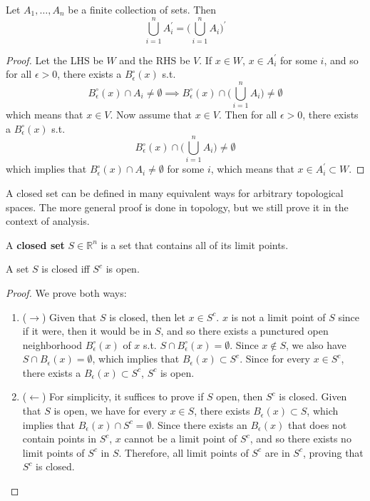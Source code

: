 \documentclass{article}
\begin{document}
    \begin{theorem}
      Let $A_1, \ldots, A_n$ be a finite collection of sets. Then 
      \[\bigcup_{i=1}^n A_i^\prime = \bigg( \bigcup_{i=1}^n A_i \bigg)^\prime\]
    \end{theorem}
    \begin{proof}
      Let the LHS be $W$ and the RHS be $V$. If $x \in W$, $x \in A_i^\prime$ for some $i$, and so for all $\epsilon > 0$, there exists a $B_\epsilon^\circ (x)$ s.t. 
      \[B_\epsilon^\circ (x) \cap A_i \neq \emptyset \implies B_\epsilon^\circ (x) \cap \bigg( \bigcup_{i=1}^n A_i \bigg) \neq \emptyset\]
      which means that $x \in V$. Now assume that $x \in V$. Then for all $\epsilon > 0$, there exists a $B_\epsilon^\circ (x)$ s.t. 
      \[B_\epsilon^\circ (x) \cap \bigg( \bigcup_{i=1}^n A_i \bigg) \neq \emptyset\]
      which implies that $B_\epsilon^\circ (x) \cap A_i \neq \emptyset$ for some $i$, which means that $x \in A_i^\prime \subset W$. 
    \end{proof}

    A closed set can be defined in many equivalent ways for arbitrary topological spaces. The more general proof is done in topology, but we still prove it in the context of analysis. 

    \begin{definition}
      A \textbf{closed set} $S \in \mathbb{R}^n$ is a set that contains all of its limit points. 
    \end{definition}

    \begin{theorem}
      A set $S$ is closed iff $S^c$ is open. 
    \end{theorem}
    \begin{proof}
      We prove both ways: 
      \begin{enumerate}
        \item ($\rightarrow$) Given that $S$ is closed, then let $x \in S^c$. $x$ is not a limit point of $S$ since if it were, then it would be in $S$, and so there exists a punctured open neighborhood $B_\epsilon^\circ (x)$ of $x$ s.t. $S \cap B_\epsilon^\circ (x) = \emptyset$. Since $x \not\in S$, we also have $S \cap B_\epsilon (x) = \emptyset$, which implies that $B_\epsilon (x) \subset S^c$. Since for every $x \in S^c$, there exists a $B_\epsilon (x) \subset S^c$, $S^c$ is open. 

        \item ($\leftarrow$) For simplicity, it suffices to prove if $S$ open, then $S^c$ is closed. Given that $S$ is open, we have for every $x \in S$, there exists $B_\epsilon (x) \subset S$, which implies that $B_\epsilon (x) \cap S^c = \emptyset$. Since there exists an $B_\epsilon (x)$ that does not contain points in $S^c$, $x$ cannot be a limit point of $S^c$, and so there exists no limit points of $S^c$ in $S$. Therefore, all limit points of $S^c$ are in $S^c$, proving that $S^c$ is closed.  
      \end{enumerate}
    \end{proof}
\end{document}
